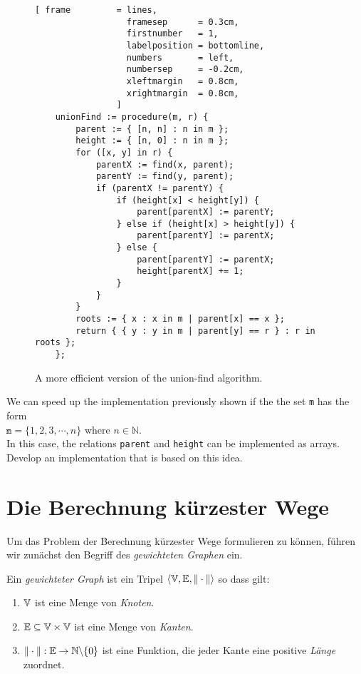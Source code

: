 \begin{figure}[!ht]
\centering
\begin{Verbatim}[ frame         = lines, 
                  framesep      = 0.3cm, 
                  firstnumber   = 1,
                  labelposition = bottomline,
                  numbers       = left,
                  numbersep     = -0.2cm,
                  xleftmargin   = 0.8cm,
                  xrightmargin  = 0.8cm,
                ]
    unionFind := procedure(m, r) {
        parent := { [n, n] : n in m };
        height := { [n, 0] : n in m };
        for ([x, y] in r) {
            parentX := find(x, parent);
            parentY := find(y, parent);
            if (parentX != parentY) {
                if (height[x] < height[y]) {
                    parent[parentX] := parentY;  
                } else if (height[x] > height[y]) {
                    parent[parentY] := parentX;  
                } else {
                    parent[parentY] := parentX;  
                    height[parentX] += 1;
                }
            }
        }
        roots := { x : x in m | parent[x] == x };
        return { { y : y in m | parent[y] == r } : r in roots };
    };
\end{Verbatim}
\vspace*{-0.3cm}
\caption{A more efficient version of the union-find algorithm.}
\label{fig:union-find.stlx}
\end{figure}

\exercise
We can speed up the implementation previously shown if the the set \texttt{m} has the form
\\[0.2cm]
\hspace*{1.3cm}
$\mathtt{m} = \{ 1, 2, 3, \cdots, n \}$ \quad where $n \in \mathbb{N}$.
\\[0.2cm]
In this case, the relations \texttt{parent} and \texttt{height} can be implemented as arrays.
Develop an implementation that is based on this idea.
\eox

\section[Shortest Paths]{Die Berechnung k\"urzester Wege}
Um das Problem der Berechnung k\"urzester Wege formulieren zu k\"onnen, f\"uhren wir zun\"achst 
den Begriff des \emph{gewichteten Graphen} ein.  

\begin{Definition} \lb
  Ein  {\em gewichteter Graph} ist ein Tripel 
   $\langle {\mathbb V}, {\mathbb E}, \|\cdot\| \rangle$ so dass gilt:
  \begin{enumerate}
  \item ${\mathbb V}$ ist eine Menge von \emph{Knoten}.
  \item ${\mathbb E} \subseteq {\mathbb V} \times {\mathbb V}$ ist eine Menge von \emph{Kanten}.
  \item $\|\cdot\|: {\mathbb E} \rightarrow {\mathbb N} \backslash\{0\}$ ist eine Funktion,
        die jeder Kante eine positive \emph{L\"ange} zuordnet.
        \conclude
  \end{enumerate}
\end{Definition}

